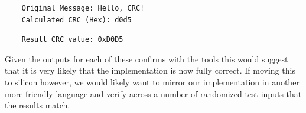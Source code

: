 \begin{verbatim}
    Original Message: Hello, CRC!
    Calculated CRC (Hex): d0d5
\end{verbatim}

\begin{verbatim}
    Result CRC value: 0xD0D5
\end{verbatim}

\RaggedRight
Given the outputs for each of these confirms with the tools this would suggest that it is very likely that the implementation is now fully correct. If moving this to silicon however, we would likely want to mirror our implementation in another more friendly language and verify across a number of randomized test inputs that the results match.